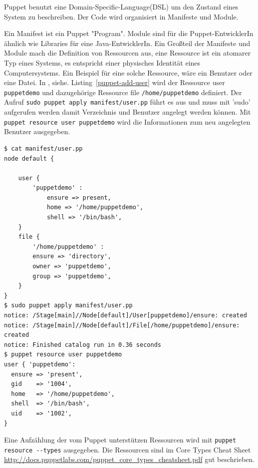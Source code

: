 \documentclass[12pt,a4paper,ngerman]{article}
\newcommand{\reffig}[1]{, siehe. Abbildung~\ref{#1}}
\newcommand{\reflst}[1]{, siehe. Listing~\ref{#1}}
\begin{document}
Puppet benutzt eine Domain-Specific-Language(DSL) um den Zustand eines System zu beschreiben. Der Code wird organisiert in Manifeste und Module.

Ein Manifest ist ein Puppet "Program". Module sind für die Puppet-EntwicklerIn ähnlich wie Libraries für eine Java-EntwicklerIn. Ein Großteil der Manifeste und Module mach die Definition von Ressourcen aus, eine Ressource ist ein atomarer Typ eines Systems, es entspricht einer physisches Identität eines Computersystems. Ein Beispiel für eine solche Ressource, wäre ein Benutzer oder eine Datei. In \reflst{puppet-add-user} wird der Ressource user \lstinline$puppetdemo$ und dazugehörige Ressource file \lstinline$/home/puppetdemo$ definiert. Der Aufruf \lstinline$sudo puppet apply manifest/user.pp$ führt es aus und muss mit 'sudo' aufgerufen werden damit Verzeichnis und Benutzer angelegt werden können.
Mit \lstinline$puppet resource user puppetdemo$ wird die Informationen zum neu angelegten Benutzer ausgegeben.

\begin{lstlisting}[caption=User mit Puppet anlegen, label=puppet-add-user]
$ cat manifest/user.pp 
node default {

    user {
        'puppetdemo' :
            ensure => present,
            home => '/home/puppetdemo',
            shell => '/bin/bash',
    }
    file {
        '/home/puppetdemo' :
        ensure => 'directory',
        owner => 'puppetdemo',
        group => 'puppetdemo',
    }
}
$ sudo puppet apply manifest/user.pp 
notice: /Stage[main]//Node[default]/User[puppetdemo]/ensure: created
notice: /Stage[main]//Node[default]/File[/home/puppetdemo]/ensure: created
notice: Finished catalog run in 0.36 seconds
$ puppet resource user puppetdemo
user { 'puppetdemo':
  ensure => 'present',
  gid    => '1004',
  home   => '/home/puppetdemo',
  shell  => '/bin/bash',
  uid    => '1002',
}
\end{lstlisting}

Eine Aufzählung der vom Puppet unterstützen Ressourcen wird mit \lstinline$puppet resource --types$ ausgegeben. Die Ressourcen sind im Core Types Cheat Sheet \url{http://docs.puppetlabs.com/puppet_core_types_cheatsheet.pdf} gut beschrieben.


\end{document}
